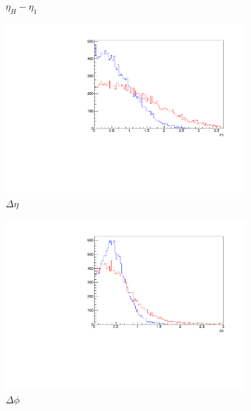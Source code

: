 \begin{figure}[htbp]
\begin{subfigure}[b]{0.3\textwidth}
	                \caption{$\eta_H - \eta_1$}
	                \label{fig:angle}
	\end{subfigure}
	\begin{subfigure}[b]{0.3\textwidth}
	                \includegraphics[width=\textwidth]{img/deta}
	                \caption{$\Delta\eta$}
	                \label{fig:deta}
	\end{subfigure}
	\begin{subfigure}[b]{0.3\textwidth}
	                \includegraphics[width=\textwidth]{img/dphi}
	                \caption{$\Delta\phi$}
	                \label{fig:dphi}
	\end{subfigure}	
	\begin{subfigure}[b]{0.3\textwidth}

\end{subfigure}
\end{figure}
